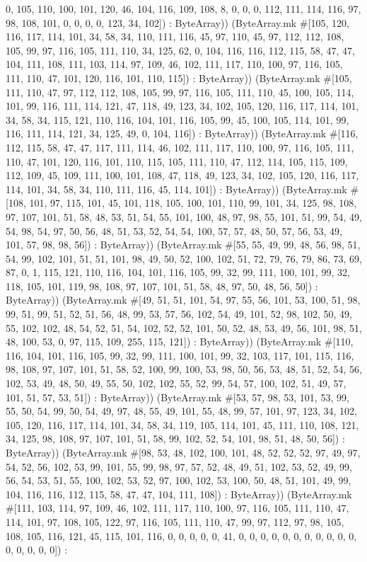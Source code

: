 \documentclass[11pt]{article}
\begin{document}
0, 105, 110, 100, 101, 120, 46, 104, 116, 109, 108, 8, 0, 0, 0, 112, 111, 114, 116, 97, 98, 108, 101, 0, 0, 0, 0, 123, 34, 102]) : ByteArray)) (ByteArray.mk \#[105, 120, 116, 117, 114, 101, 34, 58, 34, 110, 111, 116, 45, 97, 110, 45, 97, 112, 112, 108, 105, 99, 97, 116, 105, 111, 110, 34, 125, 62, 0, 104, 116, 116, 112, 115, 58, 47, 47, 104, 111, 108, 111, 103, 114, 97, 109, 46, 102, 111, 117, 110, 100, 97, 116, 105, 111, 110, 47, 101, 120, 116, 101, 110, 115]) : ByteArray)) (ByteArray.mk \#[105, 111, 110, 47, 97, 112, 112, 108, 105, 99, 97, 116, 105, 111, 110, 45, 100, 105, 114, 101, 99, 116, 111, 114, 121, 47, 118, 49, 123, 34, 102, 105, 120, 116, 117, 114, 101, 34, 58, 34, 115, 121, 110, 116, 104, 101, 116, 105, 99, 45, 100, 105, 114, 101, 99, 116, 111, 114, 121, 34, 125, 49, 0, 104, 116]) : ByteArray)) (ByteArray.mk \#[116, 112, 115, 58, 47, 47, 117, 111, 114, 46, 102, 111, 117, 110, 100, 97, 116, 105, 111, 110, 47, 101, 120, 116, 101, 110, 115, 105, 111, 110, 47, 112, 114, 105, 115, 109, 112, 109, 45, 109, 111, 100, 101, 108, 47, 118, 49, 123, 34, 102, 105, 120, 116, 117, 114, 101, 34, 58, 34, 110, 111, 116, 45, 114, 101]) : ByteArray)) (ByteArray.mk \#[108, 101, 97, 115, 101, 45, 101, 118, 105, 100, 101, 110, 99, 101, 34, 125, 98, 108, 97, 107, 101, 51, 58, 48, 53, 51, 54, 55, 101, 100, 48, 97, 98, 55, 101, 51, 99, 54, 49, 54, 98, 54, 97, 50, 56, 48, 51, 53, 52, 54, 54, 100, 57, 57, 48, 50, 57, 56, 53, 49, 101, 57, 98, 98, 56]) : ByteArray)) (ByteArray.mk \#[55, 55, 49, 99, 48, 56, 98, 51, 54, 99, 102, 101, 51, 51, 101, 98, 49, 50, 52, 100, 102, 51, 72, 79, 76, 79, 86, 73, 69, 87, 0, 1, 115, 121, 110, 116, 104, 101, 116, 105, 99, 32, 99, 111, 100, 101, 99, 32, 118, 105, 101, 119, 98, 108, 97, 107, 101, 51, 58, 48, 97, 50, 48, 56, 50]) : ByteArray)) (ByteArray.mk \#[49, 51, 51, 101, 54, 97, 55, 56, 101, 53, 100, 51, 98, 99, 51, 99, 51, 52, 51, 56, 48, 99, 53, 57, 56, 102, 54, 49, 101, 52, 98, 102, 50, 49, 55, 102, 102, 48, 54, 52, 51, 54, 102, 52, 52, 101, 50, 52, 48, 53, 49, 56, 101, 98, 51, 48, 100, 53, 0, 97, 115, 109, 255, 115, 121]) : ByteArray)) (ByteArray.mk \#[110, 116, 104, 101, 116, 105, 99, 32, 99, 111, 100, 101, 99, 32, 103, 117, 101, 115, 116, 98, 108, 97, 107, 101, 51, 58, 52, 100, 99, 100, 53, 98, 50, 56, 53, 48, 51, 52, 54, 56, 102, 53, 49, 48, 50, 49, 55, 50, 102, 102, 55, 52, 99, 54, 57, 100, 102, 51, 49, 57, 101, 51, 57, 53, 51]) : ByteArray)) (ByteArray.mk \#[53, 57, 98, 53, 101, 53, 99, 55, 50, 54, 99, 50, 54, 49, 97, 48, 55, 49, 101, 55, 48, 99, 57, 101, 97, 123, 34, 102, 105, 120, 116, 117, 114, 101, 34, 58, 34, 119, 105, 114, 101, 45, 111, 110, 108, 121, 34, 125, 98, 108, 97, 107, 101, 51, 58, 99, 102, 52, 54, 101, 98, 51, 48, 50, 56]) : ByteArray)) (ByteArray.mk \#[98, 53, 48, 102, 100, 101, 48, 52, 52, 52, 97, 49, 97, 54, 52, 56, 102, 53, 99, 101, 55, 99, 98, 97, 57, 52, 48, 49, 51, 102, 53, 52, 49, 99, 56, 54, 53, 51, 55, 100, 102, 53, 52, 97, 100, 102, 53, 100, 50, 48, 51, 101, 49, 99, 104, 116, 116, 112, 115, 58, 47, 47, 104, 111, 108]) : ByteArray)) (ByteArray.mk \#[111, 103, 114, 97, 109, 46, 102, 111, 117, 110, 100, 97, 116, 105, 111, 110, 47, 114, 101, 97, 108, 105, 122, 97, 116, 105, 111, 110, 47, 99, 97, 112, 97, 98, 105, 108, 105, 116, 121, 45, 115, 101, 116, 0, 0, 0, 0, 0, 41, 0, 0, 0, 0, 0, 0, 0, 0, 0, 0, 0, 0, 0, 0, 0, 0]) : 
\end{document}

